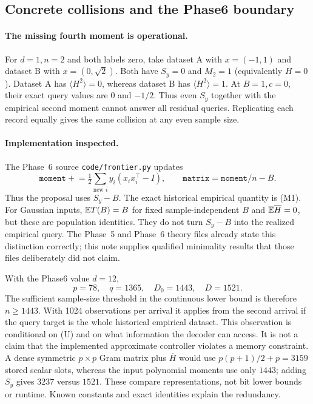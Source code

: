 \subsection{Concrete collisions and the Phase6 boundary}

\paragraph{The missing fourth moment is operational.}
For $d=1,n=2$ and both labels zero, take dataset A with $x=(-1,1)$
and dataset B with $x=(0,\sqrt2)$. Both have $S_y=0$ and
$M_2=1$ (equivalently $\overline H=0$). Dataset A has
$\langle H^2\rangle=0$, whereas dataset B has
$\langle H^2\rangle=1$. At $B=1,c=0$, their exact query values
are $0$ and $-1/2$. Thus even $S_y$ together with the empirical
second moment cannot answer all residual queries. Replicating each
record equally gives the same collision at any even sample size.

\paragraph{Implementation inspected.}
The Phase~6 source \texttt{code/frontier.py}\cite{phase6} updates
\[
 \texttt{moment}\mathrel{+}=
 \tfrac12\sum_{\text{new }i}y_i(x_ix_i^\top-I),\qquad
 \texttt{matrix}=\texttt{moment}/n-B.
\]
Thus the proposal uses $S_y-B$. The exact historical empirical
quantity is (M1). For Gaussian inputs, $\mathbb E T(B)=B$ for fixed
sample-independent $B$ and $\mathbb E\overline H=0$, but these are
population identities. They do not turn $S_y-B$ into the realized
empirical query. The Phase~5 and Phase~6 theory files\cite{phase5,phase6} already state
this distinction correctly; this note supplies qualified minimality
results that those files deliberately did not claim.

With the Phase6 value $d=12$,
\[
 p=78,\quad q=1365,\quad D_0=1443,\quad D=1521.
\]
The sufficient sample-size threshold in the continuous lower bound
is therefore $n\ge1443$. With 1024 observations per arrival it
applies from the second arrival if the query target is the whole
historical empirical dataset. This observation is conditional on
(U) and on what information the decoder can access. It is not a
claim that the implemented approximate controller violates a memory
constraint. A dense symmetric $p\times p$ Gram matrix plus
$\overline H$ would use $p(p+1)/2+p=3159$ stored scalar slots,
whereas the input polynomial moments use only $1443$; adding $S_y$
gives $3237$ versus $1521$. These compare representations, not bit
lower bounds or runtime. Known constants and exact identities explain
the redundancy.

